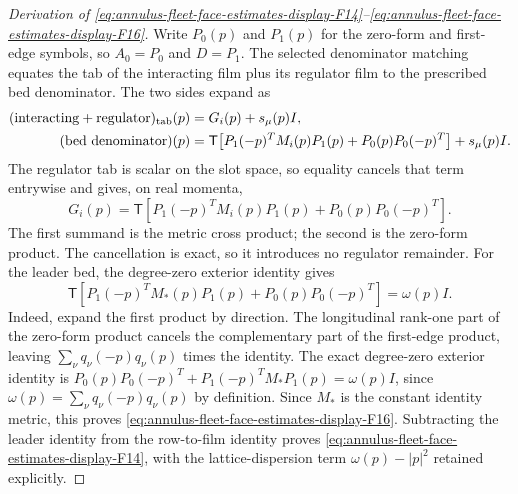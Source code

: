\begin{proof}[Derivation of \eqref{eq:annulus-fleet-face-estimates-display-F14}--\eqref{eq:annulus-fleet-face-estimates-display-F16}]
Write $P_0(p)$ and $P_1(p)$ for the zero-form and first-edge symbols, so
$A_0=P_0$ and $D=P_1$. The selected denominator matching equates the
tab of the interacting film plus its regulator film to the prescribed
bed denominator. The two sides expand as
\[
 \begin{split}
 (\mathrm{interacting}+\mathrm{regulator})_{\rm tab}(p)
   &=G_i(p)+s_\mu(p)I,\\
 (\mathrm{bed\ denominator})(p)
   &=\mathsf T\!\left[P_1(-p)^TM_i(p)P_1(p)
           +P_0(p)P_0(-p)^T\right]+s_\mu(p)I.
 \end{split}
\]
The regulator tab is scalar on the slot space, so equality cancels that
term entrywise and gives, on real momenta,
\[
 G_i(p)=\mathsf T\!\left[P_1(-p)^TM_i(p)P_1(p)
                    +P_0(p)P_0(-p)^T\right].
\]
The first summand is the metric cross product; the second is the zero-form
product. The cancellation is exact, so it introduces no regulator
remainder. For the leader bed, the degree-zero exterior identity gives
\[
 \mathsf T\!\left[P_1(-p)^TM_*(p)P_1(p)
              +P_0(p)P_0(-p)^T\right]=\omega(p)I.
\]
Indeed, expand the first product by direction. The longitudinal rank-one
part of the zero-form product cancels the complementary part of the
first-edge product, leaving $\sum_\nu q_\nu(-p)q_\nu(p)$ times the
identity. The exact degree-zero exterior identity is
$P_0(p)P_0(-p)^T+P_1(-p)^TM_*P_1(p)=\omega(p)I$,
since $\omega(p)=\sum_\nu q_\nu(-p)q_\nu(p)$ by definition. Since
$M_*$ is the constant identity metric, this proves
\eqref{eq:annulus-fleet-face-estimates-display-F16}. Subtracting the
leader identity from the row-to-film identity proves \eqref{eq:annulus-fleet-face-estimates-display-F14}, with the
lattice-dispersion term $\omega(p)-|p|^2$ retained explicitly.


\end{proof}
